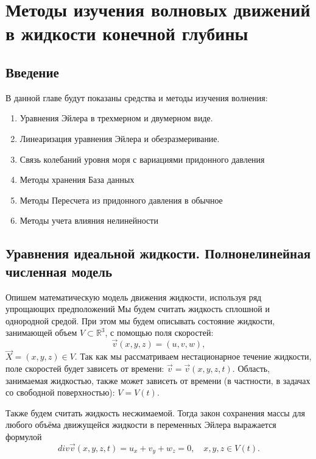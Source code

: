 \chapter{Методы изучения волновых движений в жидкости конечной глубины} \label{chapt1}

\section{Введение}

В данной главе будут показаны средства и методы изучения волнения:
\begin{enumerate}
  \item Уравнения Эйлера в трехмерном и двумерном виде.
  \item Линеаризация уравнения Эйлера и обезразмеривание.
  \item Связь колебаний уровня моря с вариациями придонного давления
  \item Методы хранения База данных
  \item Методы Пересчета из придонного давления в обычное
  \item Методы учета влияния нелинейности
\end{enumerate}
\section{Уравнения идеальной жидкости. Полнонелинейная численная модель}


Опишем математическую модель движения жидкости, используя ряд упрощающих предположений
Мы будем считать жидкость сплошной и однородной средой. При этом мы
будем описывать состояние жидкости, занимающей объем $V\subset
\mathbb{R}^3$, с помощью поля скоростей:
$$
\overrightarrow v(x,y,z)=(u,v,w),
$$
$\overrightarrow X=(x,y,z)\in V$. Так как мы рассматриваем
нестационарное течение жидкости, поле скоростей будет зависеть от
вре\-ме\-ни: $\overrightarrow v=\overrightarrow v(x,y,z,t)$. Область,
занимаемая жидкостью, также может зависеть от времени (в
частности, в задачах со свободной поверхностью): $V=V(t).$

Также будем считать жидкость несжимаемой. Тогда закон сохранения массы для любого объёма движущейся жидкости в переменных Эйлера выражается формулой
\begin{equation}\label{eq_div}
div\overrightarrow v(x,y,z,t)=u_x+v_y+w_z=0,\quad
x,y,z\in V(t).
\end{equation}

